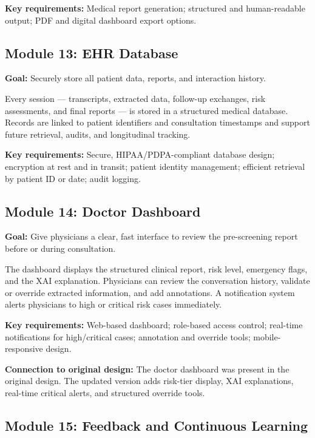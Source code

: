 \documentclass[12pt,a4paper]{article}
\begin{document}
\textbf{Key requirements:} Medical report generation; structured and
human-readable output; PDF and digital dashboard export options.

\subsection{Module 13: EHR Database}
\label{sec:m13}

\textbf{Goal:} Securely store all patient data, reports, and interaction
history.

Every session --- transcripts, extracted data, follow-up exchanges, risk
assessments, and final reports --- is stored in a structured medical
database. Records are linked to patient identifiers and consultation
timestamps and support future retrieval, audits, and longitudinal
tracking.

\textbf{Key requirements:} Secure, HIPAA/PDPA-compliant database design;
encryption at rest and in transit; patient identity management; efficient
retrieval by patient ID or date; audit logging.

\subsection{Module 14: Doctor Dashboard}
\label{sec:m14}

\textbf{Goal:} Give physicians a clear, fast interface to review the
pre-screening report before or during consultation.

The dashboard displays the structured clinical report, risk level,
emergency flags, and the XAI explanation. Physicians can review the
conversation history, validate or override extracted information, and
add annotations. A notification system alerts physicians to high or
critical risk cases immediately.

\textbf{Key requirements:} Web-based dashboard; role-based access
control; real-time notifications for high/critical cases; annotation and
override tools; mobile-responsive design.

\textbf{Connection to original design:} The doctor dashboard was present
in the original design. The updated version adds risk-tier display,
XAI explanations, real-time critical alerts, and structured override
tools.

\subsection{Module 15: Feedback and Continuous Learning}
\label{sec:m15}
\end{document}
